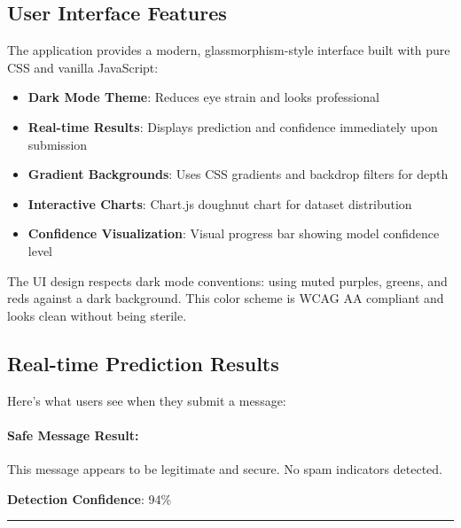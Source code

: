 \documentclass[12pt, a4paper]{article}
\begin{document}
\subsection{User Interface Features}

The application provides a modern, glassmorphism-style interface built with pure CSS and vanilla JavaScript:

\begin{itemize}
    \item \textbf{Dark Mode Theme}: Reduces eye strain and looks professional
    \item \textbf{Real-time Results}: Displays prediction and confidence immediately upon submission
    \item \textbf{Gradient Backgrounds}: Uses CSS gradients and backdrop filters for depth
    \item \textbf{Interactive Charts}: Chart.js doughnut chart for dataset distribution
    \item \textbf{Confidence Visualization}: Visual progress bar showing model confidence level
\end{itemize}

\begin{devnote}
    The UI design respects dark mode conventions: using muted purples, greens, and reds against a dark background. This color scheme is WCAG AA compliant and looks clean without being sterile.
\end{devnote}

\subsection{Real-time Prediction Results}

Here's what users see when they submit a message:

\paragraph{Safe Message Result:}
\begin{center}
\begin{tcolorbox}[colback=white, colframe=success, title=\textbf{[OK] Safe Message}]
    This message appears to be legitimate and secure. No spam indicators detected.
    
    \textbf{Detection Confidence}: 94\%
    
    \textcolor{success}{\rule{0.75\textwidth}{5pt}}
\end{tcolorbox}
\end{center}
\end{document}

